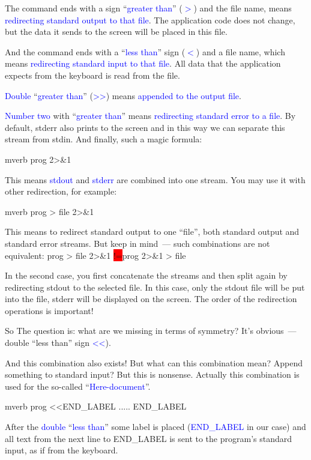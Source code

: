 \documentclass[12pt]{report}
\newcommand{\struct}[1]{\textcolor{blue}{#1}}
\begin{document}
\medskip
The command ends with a sign ``\struct{greater than}'' (\struct{$>$}) and
the file name, means \struct{redirecting standard output to that file}.
The application code does not change, but the data it sends to the screen
will be placed in this file.

\medskip
And the command ends with a ``\struct{less than}'' sign (\struct{$<$}) and
a file name, which means \struct{redirecting standard input to that file}.
All data that the application expects from the keyboard is read from the file.

\medskip
\struct{Double} ``\struct{greater than}'' (\struct{>\hspace{-0.4ex}>}) means
\struct{appended to the output file}.

\medskip
\struct{Number two} with ``\struct{greater than}'' means \struct{redirecting
standard error to a file}. By default, stderr also prints to the screen and in
this way we can separate this stream from stdin.
And finally, such a magic formula:
\begin{code}{mverb}
prog 2>&1
\end{code}
This means \struct{stdout} and \struct{stderr} are combined into one stream.
You may use it with other redirection, for example:
\begin{code}{mverb}
prog > file 2>&1
\end{code}
This means to redirect standard output to one ``file'', both standard
output and standard error streams. But keep in mind~--- such combinations
are not equivalent:
\colorbox{mverb}{prog > file 2>\&1 }\colorbox{red}{!=}\colorbox{mverb}{prog 2>\&1 > file}

\medskip
In the second case, you first concatenate the streams and then split again
by redirecting stdout to the selected file. In this case,
only the stdout file will be put into the file, stderr will be displayed on
the screen. The order of the redirection operations is important!


\medskip
So The question is: what are we missing in terms of symmetry?
It's obvious~--- double ``less than'' sign %
\struct{<\hspace{-0.4ex}<}).

\medskip
And this combination also exists! But what can this combination mean?
Append something to standard input? But this is nonsense. Actually this
combination is used for the so-called ``\struct{Here-document}''.
\begin{code}{mverb}
prog <<END_LABEL
.....
END_LABEL
\end{code}
After the \struct{double} ``\struct{less than}'' some label is placed
(\struct{END\_LABEL} in our case) and all text from the next line
to END\_LABEL is sent to the program's standard input, as if from the keyboard.
\end{document}
